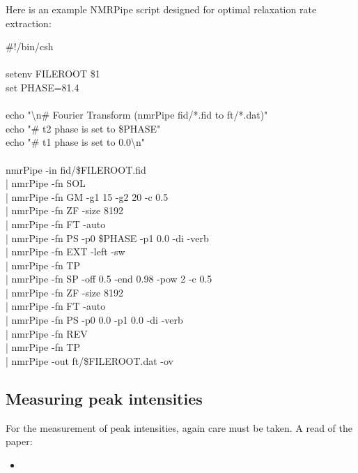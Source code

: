 Here is an example NMRPipe script designed for optimal relaxation rate extraction:

\begin{exampleenv}
\#!/bin/csh \\
 \\
setenv FILEROOT \$1 \\
set PHASE=81.4 \\
 \\
echo "\textbackslash n\# Fourier Transform (nmrPipe fid/*.fid to ft/*.dat)" \\
echo "\# t2 phase is set to \$PHASE" \\
echo "\# t1 phase is set to 0.0\textbackslash n" \\
 \\
nmrPipe -in fid/\$FILEROOT.fid \ \\
| nmrPipe -fn SOL \ \\
| nmrPipe -fn GM -g1 15 -g2 20 -c 0.5 \ \\
| nmrPipe -fn ZF -size 8192 \ \\
| nmrPipe -fn FT -auto \ \\
| nmrPipe -fn PS -p0 \$PHASE -p1 0.0 -di -verb \ \\
| nmrPipe -fn EXT -left -sw \ \\
| nmrPipe -fn TP \ \\
| nmrPipe -fn SP -off 0.5 -end 0.98 -pow 2 -c 0.5 \ \\
| nmrPipe -fn ZF -size 8192 \ \\
| nmrPipe -fn FT -auto \ \\
| nmrPipe -fn PS -p0 0.0 -p1 0.0 -di -verb \ \\
| nmrPipe -fn REV \ \\
| nmrPipe -fn TP \ \\
| nmrPipe -out ft/\$FILEROOT.dat -ov
\end{exampleenv}



\subsection{Measuring peak intensities}

For the measurement of peak intensities, again care must be taken.  A read of the paper:

\begin{itemize}
\item {}
\end{itemize}

